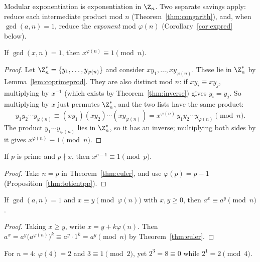 \begin{note}
Modular exponentiation is exponentiation in $\Z_n$. Two separate savings apply: reduce each intermediate product mod $n$ (Theorem~\ref{thm:congarith}), and, when $\gcd(a,n)=1$, reduce the \emph{exponent} mod $\varphi(n)$ (Corollary~\ref{cor:expred} below).
\end{note}

\begin{theorem}[Euler]
\label{thm:euler}
If $\gcd(x,n)=1$, then $x^{\varphi(n)}\equiv1\pmod n$.
\end{theorem}
\begin{proof}
Let $\Z_n^*=\{y_1,\dots,y_{\varphi(n)}\}$ and consider $xy_1,\dots,xy_{\varphi(n)}$. These lie in $\Z_n^*$ by Lemma~\ref{lem:coprimeprod}. They are also distinct mod $n$: if $xy_i\equiv xy_j$, multiplying by $x^{-1}$ (which exists by Theorem~\ref{thm:inverse}) gives $y_i=y_j$. So multiplying by $x$ just permutes $\Z_n^*$, and the two lists have the same product:
\[
y_1y_2\cdots y_{\varphi(n)} \equiv (xy_1)(xy_2)\cdots(xy_{\varphi(n)}) = x^{\varphi(n)}\,y_1y_2\cdots y_{\varphi(n)} \pmod n.
\]
The product $y_1\cdots y_{\varphi(n)}$ lies in $\Z_n^*$, so it has an inverse; multiplying both sides by it gives $x^{\varphi(n)}\equiv1\pmod n$.
\end{proof}

\begin{corollary}
\label{thm:flt}
If $p$ is prime and $p\nmid x$, then $x^{p-1}\equiv1\pmod p$.
\end{corollary}
\begin{proof}
Take $n=p$ in Theorem~\ref{thm:euler}, and use $\varphi(p)=p-1$ (Proposition~\ref{thm:totientpp}).
\end{proof}

\begin{corollary}\label{cor:expred}
If $\gcd(a,n)=1$ and $x\equiv y\pmod{\varphi(n)}$ with $x,y\ge0$, then $a^x\equiv a^y\pmod n$.
\end{corollary}
\begin{proof}
Taking $x\ge y$, write $x=y+k\varphi(n)$. Then $a^x=a^y\bigl(a^{\varphi(n)}\bigr)^k\equiv a^y\cdot1^k=a^y\pmod n$ by Theorem~\ref{thm:euler}.
\end{proof}

\begin{note}
For $n=4$: $\varphi(4)=2$ and $3\equiv1\pmod2$, yet $2^3=8\equiv0$ while $2^1=2\pmod4$.
\end{note}

